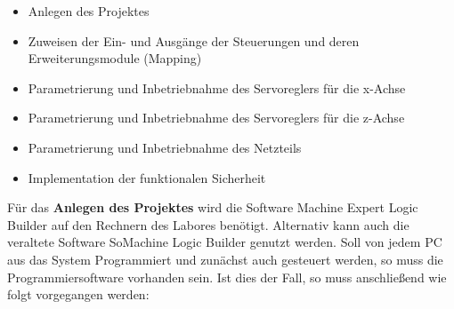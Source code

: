\documentclass[../../../Bachelorarbeit.tex]{subfiles}
\begin{document}
\begin{itemize}
    \item Anlegen des Projektes
    \item Zuweisen der Ein- und Ausgänge der Steuerungen und deren Erweiterungsmodule (\eng Mapping)
    \item Parametrierung und Inbetriebnahme des Servoreglers für die x-Achse
    \item Parametrierung und Inbetriebnahme des Servoreglers für die z-Achse
    \item Parametrierung und Inbetriebnahme des Netzteils
    \item Implementation der funktionalen Sicherheit
\end{itemize}

Für das \textbf{Anlegen des Projektes} wird die Software Machine Expert Logic Builder auf den Rechnern des Labores benötigt. Alternativ kann auch die veraltete Software SoMachine Logic Builder genutzt werden. Soll von jedem PC aus das System Programmiert und zunächst auch gesteuert werden, so muss die Programmiersoftware vorhanden sein. Ist dies der Fall, so muss anschließend wie folgt vorgegangen werden:
\end{document}
